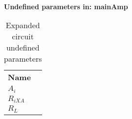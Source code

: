 {\textbf{Undefined parameters in: mainAmp}}

\begin{table}[H]
\centering
\begin{tabular}[c]{l}
\textbf{Name} \\ 
\rowcolor{myyellow}
$A_{i}$ \\ 
$R_{i XA}$ \\ 
\rowcolor{myyellow}
$R_{L}$ \\ 
\end{tabular}
\caption{Expanded circuit undefined parameters}
\end{table}

